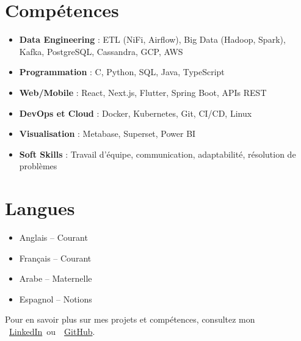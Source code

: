 \documentclass[10pt,a4paper,sans]{moderncv}
\begin{document}
\section{\fontsize{11}{12.1}\selectfont Compétences}
\vspace{-6pt}
\begin{itemize}[leftmargin=0.3cm, itemsep=-2pt, topsep=0pt, partopsep=0pt, parsep=0pt]
  \item \textbf{Data Engineering} : ETL (NiFi, Airflow), Big Data (Hadoop, Spark), Kafka, PostgreSQL, Cassandra, GCP, AWS
  \item \textbf{Programmation} : C, Python, SQL, Java, TypeScript
  \item \textbf{Web/Mobile} : React, Next.js, Flutter, Spring Boot, APIs REST
  \item \textbf{DevOps et Cloud} : Docker, Kubernetes, Git, CI/CD, Linux
  \item \textbf{Visualisation} : Metabase, Superset, Power BI
  \item \textbf{Soft Skills} : Travail d’équipe, communication, adaptabilité, résolution de problèmes
\end{itemize}

\vspace{-17pt}
\section{\fontsize{11}{12.1}\selectfont Langues}
\vspace{-16pt}
\begin{multicols}{2}
\begin{itemize}[leftmargin=0.3cm, itemsep=-2pt, topsep=0pt, partopsep=0pt, parsep=0pt]
    \item Anglais – Courant
    \item Français – Courant
    \item Arabe – Maternelle
    \item Espagnol – Notions
\end{itemize}
\end{multicols}


\vspace{-21pt}
\begin{center}
    {\fontsize{9}{11}\selectfont\color{gray}
    Pour en savoir plus sur mes projets et compétences, consultez mon~
    \faLinkedin~\href{https://www.linkedin.com/in/ahmed-makroum/}{LinkedIn}~ou~\faGithub~\href{https://github.com/ahmedmakroum}{GitHub}.}
\end{center}
\end{document}
